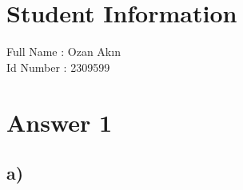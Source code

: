 \documentclass[11pt]{article}
\begin{document}
\section*{Student Information } 
Full Name :  Ozan Akın \\
Id Number :  2309599 \\


\section*{Answer 1}
\subsection*{a)}
\end{document}
